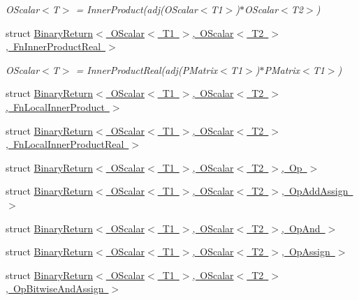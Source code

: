 \begin{DoxyCompactItemize}
\begin{DoxyCompactList}\small\item\em O\+Scalar$<$\+T$>$ = Inner\+Product(adj(\+O\+Scalar$<$\+T1$>$)$\ast$\+O\+Scalar$<$\+T2$>$) \end{DoxyCompactList}\item 
struct \mbox{\hyperlink{structENSEM_1_1BinaryReturn_3_01OScalar_3_01T1_01_4_00_01OScalar_3_01T2_01_4_00_01FnInnerProductReal_01_4}{Binary\+Return$<$ O\+Scalar$<$ T1 $>$, O\+Scalar$<$ T2 $>$, Fn\+Inner\+Product\+Real $>$}}
\begin{DoxyCompactList}\small\item\em O\+Scalar$<$\+T$>$ = Inner\+Product\+Real(adj(\+P\+Matrix$<$\+T1$>$)$\ast$\+P\+Matrix$<$\+T1$>$) \end{DoxyCompactList}\item 
struct \mbox{\hyperlink{structENSEM_1_1BinaryReturn_3_01OScalar_3_01T1_01_4_00_01OScalar_3_01T2_01_4_00_01FnLocalInnerProduct_01_4}{Binary\+Return$<$ O\+Scalar$<$ T1 $>$, O\+Scalar$<$ T2 $>$, Fn\+Local\+Inner\+Product $>$}}
\item 
struct \mbox{\hyperlink{structENSEM_1_1BinaryReturn_3_01OScalar_3_01T1_01_4_00_01OScalar_3_01T2_01_4_00_01FnLocalInnerProductReal_01_4}{Binary\+Return$<$ O\+Scalar$<$ T1 $>$, O\+Scalar$<$ T2 $>$, Fn\+Local\+Inner\+Product\+Real $>$}}
\item 
struct \mbox{\hyperlink{structENSEM_1_1BinaryReturn_3_01OScalar_3_01T1_01_4_00_01OScalar_3_01T2_01_4_00_01Op_01_4}{Binary\+Return$<$ O\+Scalar$<$ T1 $>$, O\+Scalar$<$ T2 $>$, Op $>$}}
\item 
struct \mbox{\hyperlink{structENSEM_1_1BinaryReturn_3_01OScalar_3_01T1_01_4_00_01OScalar_3_01T2_01_4_00_01OpAddAssign_01_4}{Binary\+Return$<$ O\+Scalar$<$ T1 $>$, O\+Scalar$<$ T2 $>$, Op\+Add\+Assign $>$}}
\item 
struct \mbox{\hyperlink{structENSEM_1_1BinaryReturn_3_01OScalar_3_01T1_01_4_00_01OScalar_3_01T2_01_4_00_01OpAnd_01_4}{Binary\+Return$<$ O\+Scalar$<$ T1 $>$, O\+Scalar$<$ T2 $>$, Op\+And $>$}}
\item 
struct \mbox{\hyperlink{structENSEM_1_1BinaryReturn_3_01OScalar_3_01T1_01_4_00_01OScalar_3_01T2_01_4_00_01OpAssign_01_4}{Binary\+Return$<$ O\+Scalar$<$ T1 $>$, O\+Scalar$<$ T2 $>$, Op\+Assign $>$}}
\item 
struct \mbox{\hyperlink{structENSEM_1_1BinaryReturn_3_01OScalar_3_01T1_01_4_00_01OScalar_3_01T2_01_4_00_01OpBitwiseAndAssign_01_4}{Binary\+Return$<$ O\+Scalar$<$ T1 $>$, O\+Scalar$<$ T2 $>$, Op\+Bitwise\+And\+Assign $>$}}

\end{DoxyCompactItemize}
